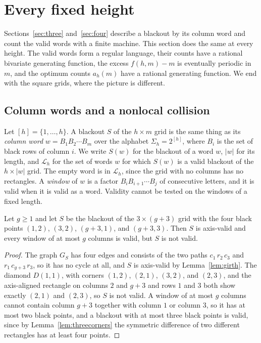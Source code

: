 \section{Every fixed height}\label{sec:height}

Sections~\ref{sec:three} and~\ref{sec:four} describe a blackout by its column word and count the valid words with a finite machine. This section does the same at every height. The valid words form a regular language, their counts have a rational bivariate generating function, the excess $f(h,m)-m$ is eventually periodic in $m$, and the optimum counts $a_h(m)$ have a rational generating function. We end with the square grids, where the picture is different.

\subsection{Column words and a nonlocal collision}

Let $[h]=\{1,\dots,h\}$. A blackout $S$ of the $h\times m$ grid is the same thing as its \emph{column word} $w=B_1B_2\cdots B_m$ over the alphabet $\Sigma_h=2^{[h]}$, where $B_i$ is the set of black rows of column $i$. We write $S(w)$ for the blackout of a word $w$, $|w|$ for its length, and $\mathcal L_h$ for the set of words $w$ for which $S(w)$ is a valid blackout of the $h\times|w|$ grid. The empty word is in $\mathcal L_h$, since the grid with no columns has no rectangles. A \emph{window} of $w$ is a factor $B_iB_{i+1}\cdots B_j$ of consecutive letters, and it is valid when it is valid as a word. Validity cannot be tested on the windows of a fixed length.

\begin{proposition}\label{prop:nonlocal}
Let $g\ge1$ and let $S$ be the blackout of the $3\times(g+3)$ grid with the four black points $(1,2)$, $(3,2)$, $(g+3,1)$, and $(g+3,3)$. Then $S$ is axis-valid and every window of at most $g$ columns is valid, but $S$ is not valid.
\end{proposition}

\begin{proof}
The graph $G_S$ has four edges and consists of the two paths $c_1\,r_2\,c_3$ and $r_1\,c_{g+3}\,r_3$, so it has no cycle at all, and $S$ is axis-valid by Lemma~\ref{lem:girth}. The diamond $D(1,1)$, with corners $(1,2)$, $(2,1)$, $(3,2)$, and $(2,3)$, and the axis-aligned rectangle on columns $2$ and $g+3$ and rows $1$ and $3$ both show exactly $(2,1)$ and $(2,3)$, so $S$ is not valid. A window of at most $g$ columns cannot contain column $g+3$ together with column $1$ or column $3$, so it has at most two black points, and a blackout with at most three black points is valid, since by Lemma~\ref{lem:threecorners} the symmetric difference of two different rectangles has at least four points.
\end{proof}

